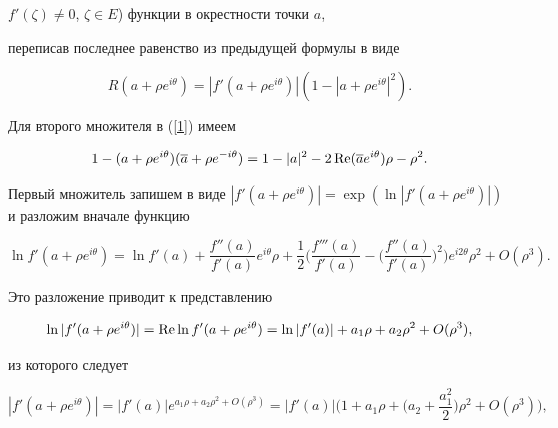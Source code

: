 $f'(\zeta)\neq 0$, $\zeta\in E$) функции в окрестности точки $a$,


переписав последнее равенство из предыдущей формулы в виде


\begin{equation}\label{1}


R(a+\rho e^{i\theta})=|f'(a+\rho e^{i\theta})|(1-|a+\rho


e^{i\theta}|^2).


\end{equation}


Для второго множителя в (\ref{1}) имеем


\begin{equation}\label{2}


1-(a+\rho e^{i\theta})(\overline{a}+\rho e^{-i\theta})=


1-|a|^2-2\re(\overline{a}


e^{i\theta})\rho-\rho^2.


\end{equation}





Первый множитель запишем в виде $|f'(a+\rho


e^{i\theta})|=\exp(\ln|f'(a+\rho e^{i\theta})|)$ и разложим вначале функцию


$$


\ln f'(a+\rho e^{i\theta})=\ln


f'(a)+\frac{f''(a)}{f'(a)}e^{i\theta}\rho


+\frac{1}{2} \bigg( \frac{f'''(a)}{f'(a)}-\bigg(\frac{{f''}(a)}{{f'}(a)}\bigg)^2 \bigg)


e^{i2\theta}\rho^2+O(\rho^3).


$$


Это разложение приводит к представлению


$$


\ln |f'(a+\rho e^{i\theta})|= \re \ln f'(a+\rho e^{i\theta})


=\ln |f'(a)|+a_1\rho+a_2\rho^2+O(\rho^3),


$$


из которого следует


$$


|f'(a+\rho


e^{i\theta})|=|f'(a)|e^{a_1\rho+a_2\rho^2+O(\rho^3)}


=|f'(a)|\bigg(1+a_1\rho+\bigg(a_2+\frac{a_1^2}{2}\bigg)\rho^2+O(\rho^3)\bigg),


$$


